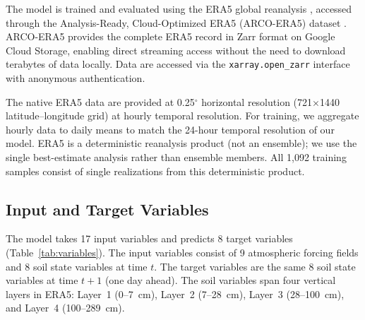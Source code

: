 \documentclass[11pt]{article}
\begin{document}
The model is trained and evaluated using the ERA5 global reanalysis \citep{hersbach2020era5}, accessed through the Analysis-Ready, Cloud-Optimized ERA5 (ARCO-ERA5) dataset \citep{carver2023arcoera5}. ARCO-ERA5 provides the complete ERA5 record in Zarr format on Google Cloud Storage, enabling direct streaming access without the need to download terabytes of data locally. Data are accessed via the \texttt{xarray.open\_zarr} interface with anonymous authentication.

The native ERA5 data are provided at 0.25$^\circ$ horizontal resolution (721$\times$1440 latitude--longitude grid) at hourly temporal resolution. For training, we aggregate hourly data to daily means to match the 24-hour temporal resolution of our model. ERA5 is a deterministic reanalysis product (not an ensemble); we use the single best-estimate analysis rather than ensemble members. All 1,092 training samples consist of single realizations from this deterministic product.

\subsection{Input and Target Variables}

The model takes 17 input variables and predicts 8 target variables (Table~\ref{tab:variables}). The input variables consist of 9 atmospheric forcing fields and 8 soil state variables at time $t$. The target variables are the same 8 soil state variables at time $t+1$ (one day ahead). The soil variables span four vertical layers in ERA5: Layer~1 (0--7~cm), Layer~2 (7--28~cm), Layer~3 (28--100~cm), and Layer~4 (100--289~cm).
\end{document}
